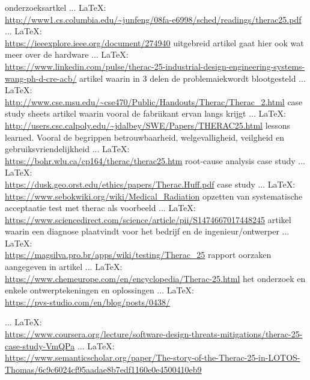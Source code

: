 \begin{thebibliography}{99}
onderzoeksartkel
 ... \LaTeX:\\ \url{http://www1.cs.columbia.edu/~junfeng/08fa-e6998/sched/readings/therac25.pdf}
 ... \LaTeX:\\ \url{https://ieeexplore.ieee.org/document/274940}
uitgebreid artikel gaat hier ook wat meer over de hardware
 ... \LaTeX:\\ \url{https://www.linkedin.com/pulse/therac-25-industrial-design-engineering-systems-wang-ph-d-cre-acb/}
artikel waarin in 3 delen de problemaiekwordt blootgesteld
 ... \LaTeX:\\ \url{http://www.cse.msu.edu/~cse470/Public/Handouts/Therac/Therac_2.html}
case study sheets
artikel waarin vooral de fabriikant ervan langs krijgt
 ... \LaTeX:\\ \url{http://users.csc.calpoly.edu/~jdalbey/SWE/Papers/THERAC25.html}
lessons learned. Vooral de begrippen betrouwbaarheid, welgevalligheid, veilgheid en gebruiksvriendelijkheid
 ... \LaTeX:\\ \url{https://bohr.wlu.ca/cp164/therac/therac25.htm}
root-cause analysis
case study
 ... \LaTeX:\\ \url{https://dusk.geo.orst.edu/ethics/papers/Therac.Huff.pdf}
case study
 ... \LaTeX:\\ \url{https://www.sebokwiki.org/wiki/Medical_Radiation}
opzetten van systematische acceptaatie test met therac als voorbeeld
 ... \LaTeX:\\ \url{https://www.sciencedirect.com/science/article/pii/S1474667017448245}
artikel waarin een diagnose plaatvindt voor het bedrijf en de ingenieur/ontwerper
 ... \LaTeX:\\ \url{https://magsilva.pro.br/apps/wiki/testing/Therac_25}
rapport
oorzaken aangegeven in artikel
 ... \LaTeX:\\ \url{https://www.chemeurope.com/en/encyclopedia/Therac-25.html}
het onderzoek en enkele ontwerptekeningen en oplossingen
 ... \LaTeX:\\ \url{https://pvs-studio.com/en/blog/posts/0438/}

 ... \LaTeX:\\ \url{https://www.coursera.org/lecture/software-design-threats-mitigations/therac-25-case-study-VmQPa}
 ... \LaTeX:\\ \url{https://www.semanticscholar.org/paper/The-story-of-the-Therac-25-in-LOTOS-Thomas/6c9c6024cf95aadae8b7edf1160e0e4500410eb9}


\end{thebibliography}
